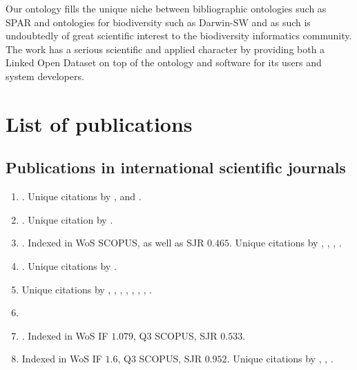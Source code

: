 Our ontology fills the unique niche between bibliographic ontologies such as SPAR and ontologies for biodiversity such as Darwin-SW and as such is undoubtedly of great scientific interest to the biodiversity informatics community. The work has a serious scientific and applied character by providing both a Linked Open Dataset on top of the ontology and software for its users and system developers.

\section*{List of publications}

\subsection*{Publications in international scientific journals}

\begingroup
{}
\setcounter{count}{99}
%

\begin{enumerate}
\item {}. Unique citations by \cite{franz_increase_2018}, \cite{ordynets_aphyllophoroid_2017} and \cite{burt_origin_2017}.
\item {}. Unique citation by \cite{pyron_21st_2018}.
\item {}. Indexed in WoS SCOPUS, as well as SJR $0.465$. Unique citations by \cite{bachman_quantifying_2018}, \cite{lin_draft_2017}, \cite{li_genomic_2017}, \cite{milano_conservazione_2017}.
\item {}. Unique citations by \cite{ordynets_aphyllophoroid_2017}.
\item {} Unique citations by \cite{tennant_multi-disciplinary_2017}, \cite{marwick_standard_2017},  \cite{kissling_towards_2018},  \cite{mathieu_egrowth:_2018}, \cite{__2018}, \cite{__2017}, \cite{filippova_biodiversity_2017},  \cite{__2017-1}.
\item {} 
\item {}. Indexed in WoS IF $1.079$, Q3 SCOPUS, SJR $0.533$.
\item {} Indexed in WoS IF $1.6$, Q3 SCOPUS, SJR $0.952$. Unique citations by \cite{michel_modelling_2018}, \cite{page_ozymandias:_2018}, \cite{page_liberating_2018}.
\end{enumerate}
\endgroup

